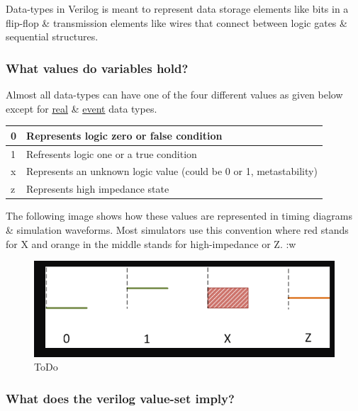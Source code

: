 \documentclass{article}
\begin{document}
	Data-types in Verilog is meant to represent data storage elements like bits in a flip-flop \& transmission elements like wires that connect between logic gates \& sequential structures. 

	\subsubsection{What values do variables hold?}

	Almost all data-types can have one of the four different values as given below except for \underline{real} \& \underline{event} data types. \newline \newline

	\begin{tabular}{|l|p{6cm}|}
		\hline
		0 & Represents logic zero or false condition \\
		\hline
		1 & Refresents logic one or a true condition \\
		\hline
		x & Represents an unknown logic value (could be 0 or 1, metastability) \\
		\hline
		z & Represents high impedance state \\
		\hline
	\end{tabular}

	The following image shows how these values are represented in timing diagrams \& simulation waveforms. Most simulators use this convention where red stands for X and orange in the middle
	stands for high-impedance or Z. \newline
	:w
	
	\begin{figure}[H]
		\includegraphics[width=\linewidth]{VerilogPics/figure_12.png}
		\caption{ToDo}
		\label{ToDo}
	\end{figure}

	\subsubsection{What does the verilog value-set imply?}
\end{document}
